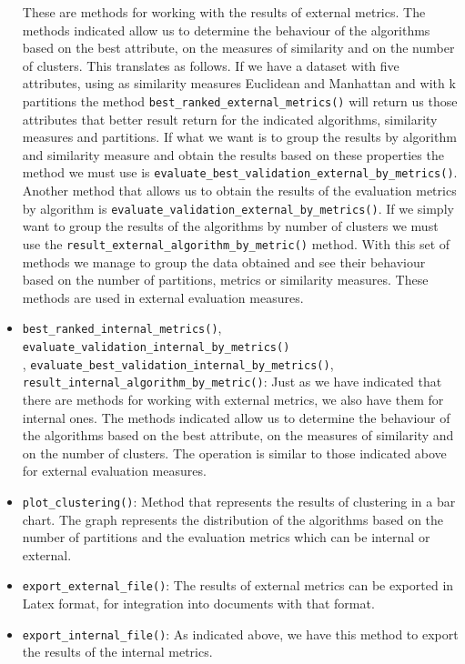 \begin{itemize}
    These are methods for working with the results of external metrics. The methods indicated allow us to determine the behaviour of the algorithms based on the best attribute, on the measures of similarity and on the number of clusters. This translates as follows. If we have a dataset with five attributes, using as similarity measures Euclidean and Manhattan and with k partitions the method \texttt{best\_ranked\_external\_metrics()} will return us those attributes that better result return for the indicated algorithms, similarity measures and partitions. If what we want is to group the results by algorithm and similarity measure and obtain the results based on these properties the method we must use is \texttt{evaluate\_best\_validation\_external\_by\_metrics()}. Another method that allows us to obtain the results of the evaluation metrics by algorithm is \texttt{evaluate\_validation\_external\_by\_metrics()}. If we simply want to group the results of the algorithms by number of clusters we must use the \texttt{result\_external\_algorithm\_by\_metric()} method. With this set of methods we manage to group the data obtained and see their behaviour based on the number of partitions, metrics or similarity measures. These methods are used in external evaluation measures.

    \item \texttt{best\_ranked\_internal\_metrics()}, \texttt{evaluate\_validation\_internal\_by\_metrics()}\\, \texttt{evaluate\_best\_validation\_internal\_by\_metrics()},\\ \texttt{result\_internal\_algorithm\_by\_metric()}: Just as we have indicated that there are methods for working with external metrics, we also have them for internal ones. The methods indicated allow us to determine the behaviour of the algorithms based on the best attribute, on the measures of similarity and on the number of clusters. The operation is similar to those indicated above for external evaluation measures.
    \item \texttt{plot\_clustering()}: Method that represents the results of clustering in a bar chart. The graph represents the distribution of the algorithms based on the number of partitions and the evaluation metrics which can be internal or external.
    \item \texttt{export\_external\_file()}: The results of external metrics can be exported in Latex format, for integration into documents with that format.
    \item \texttt{export\_internal\_file()}: As indicated above, we have this method to export the results of the internal metrics.
\end{itemize}

